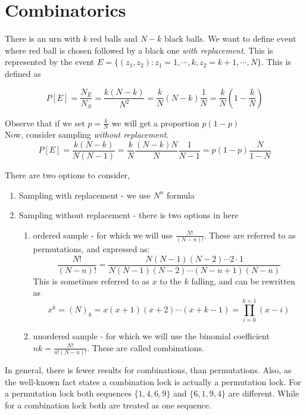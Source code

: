\documentclass{article}
\begin{document}
\section{Combinatorics}
There is an urn with $k$ red balls and $N-k$ black balls. We want to define event where red ball is chosen followed by a black one \textit{with replacement}. This is represented by the event  $E = \{ (z_1, z_2): z_1= 1,\cdots,k, z_2=k+1,\cdots,N \}$. This is defined as

\begin{equation}
P[E] = \frac{N_E}{N_S}= \frac{k(N-k)}{N^2} = \frac{k}{N} (N-k) \frac{1}{N}=\frac{k}{N}(1-\frac{k}{N})
\end{equation}

Observe that if we set $p=\frac{k}{N}$ we will get a proportion $p(1-p)$
\\
Now, consider sampling \textit{without replacement}.
\begin{equation}
P[E]= \frac{k(N-k)}{N(N-1)}=\frac{k}{N}\frac{(N-k)N}{N}\frac{1}{N-1}=p(1-p)\frac{N}{1-N}
\end{equation}

There are two options to consider,
\begin{enumerate}
\item Sampling with replacement - we use $N^n$ formula
\item Sampling without replacement  - there is two options in here
\begin{enumerate}
\item ordered sample - for which we will use $\frac{N!}{(N-n)!}$. These are referred to as permutations, and expressed as:
\begin{equation}
\frac{N!}{(N-n)!} = \frac{N(N-1)(N-2) \cdots 2\cdot1}{N(N-1)(N-2) \cdots (N-n+1)(N-n)}
\end{equation}
This is sometimes referred to as $x$ to the $k$ falling, and can be rewritten as 
\begin{equation}
x^k=(N)_k =x(x+1)(x+2) \cdots (x+k-1) = \prod_{i=0}^{k=1}(x-i)
\end{equation}
\item unordered sample - for which we will use the binomial coefficient  ${n}{k} =\frac{N!}{n!(N-n)!}$. These are called combinations.
\end{enumerate}
\end{enumerate}

In general, there is fewer results for combinations, than permutations. Also, as the well-known fact states a combination lock is actually a permutation lock. For a permutation lock both sequences $\{1,4,6,9\}$ and $\{6,1,9,4\}$ are different. While for a combination lock both are treated as one sequence.
\end{document}
